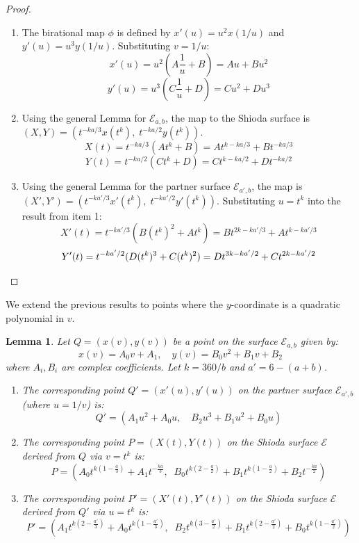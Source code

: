 \documentclass[11pt]{amsart}
\newcommand{\Ee}{{\mathcal E}}
\newtheorem{lema}[thm]{Lemma}
\numberwithin{equation}{section}
\numberwithin{table}{section}
\newcommand\<{\langle}
\begin{document}
\begin{proof}
	\begin{enumerate}
	\item[(i)] The birational map $\phi$ is defined by $x'(u) = u^2 x(1/u)$ and $y'(u) = u^3 y(1/u)$. Substituting $v=1/u$:
	\[ x'(u) = u^2 \left( A \frac{1}{u} + B \right) = Au + Bu^2 \]
	\[ y'(u) = u^3 \left( C \frac{1}{u} + D \right) = Cu^2 + Du^3 \]
	
	\item[(ii)] Using the general Lemma for $\Ee_{a,b}$, the map to the Shioda surface is $(X, Y) = (t^{-ka/3}x(t^k), \; t^{-ka/2}y(t^k))$.
	\[ X(t) = t^{-ka/3} (A t^k + B) = A t^{k - ka/3} + B t^{-ka/3} \]
	\[ Y(t) = t^{-ka/2} (C t^k + D) = C t^{k - ka/2} + D t^{-ka/2} \]
	
\item[(iii)] Using the general Lemma for the partner surface $\Ee_{a',b}$, the map is $(X', Y') = (t^{-ka'/3}x'(t^k), \; t^{-ka'/2}y'(t^k))$.
	Substituting $u=t^k$ into the result from item 1:
	\[ X'(t) = t^{-ka'/3} (B (t^k)^2 + A t^k) = B t^{2k - ka'/3} + A t^{k - ka'/3} \]
	\[ Y'(t) = t^{-ka'/2} (D (t^k)^3 + C (t^k)^2) = D t^{3k - ka'/2} + C t^{2k - ka'/2} \qedhere \]
\end{enumerate}
\end{proof}

We extend the previous results to points where the $y$-coordinate is a quadratic polynomial in $v$.

\begin{lema}
	\label{lem:quadratic_transform}
	Let $Q = (x(v), y(v))$ be a point on the surface $\Ee_{a,b}$ given by:
	\[ x(v) = A_0 v + A_1, \quad y(v) = B_0 v^2 + B_1 v + B_2 \]
	where $A_i, B_i$ are complex coefficients. Let $k = 360/b$ and $a' = 6-(a+b)$.
	
	\begin{enumerate}
		\item[(i)] The corresponding point $Q'=(x'(u), y'(u))$ on the partner surface $\Ee_{a', b}$ (where $u=1/v$) is:
		\[ Q' = (A_1 u^2 + A_0 u, \quad B_2 u^3 + B_1 u^2 + B_0 u) \]
		
		\item [(ii)] The corresponding point $P=(X(t), Y(t))$ on the Shioda surface $\Ee$ derived from $Q$ via $v=t^k$ is:
		\[ P = \left( A_0 t^{k(1 - \frac{a}{3})} + A_1 t^{-\frac{ka}{3}}, \;\; B_0 t^{k(2 - \frac{a}{2})} + B_1 t^{k(1 - \frac{a}{2})} + B_2 t^{-\frac{ka}{2}} \right) \]
		
		\item[(iii)] The corresponding point $P'=(X'(t), Y'(t))$ on the Shioda surface $\Ee$ derived from $Q'$ via $u=t^k$ is:
		\[ P' = \left( A_1 t^{k(2 - \frac{a'}{3})} + A_0 t^{k(1 - \frac{a'}{3})}, \;\; B_2 t^{k(3 - \frac{a'}{2})} + B_1 t^{k(2 - \frac{a'}{2})} + B_0 t^{k(1 - \frac{a'}{2})} \right) \]
	\end{enumerate}
\end{lema}
\end{document}
